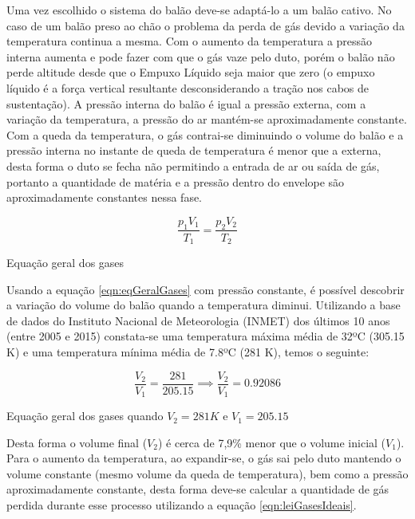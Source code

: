 		Uma vez escolhido o sistema do balão deve-se adaptá-lo a um balão cativo. No caso de um balão preso ao chão o problema da perda de gás devido a variação da temperatura continua a mesma. Com o aumento da temperatura a pressão interna aumenta e pode fazer com que o gás vaze pelo duto, porém o balão não perde altitude desde que o Empuxo Líquido seja maior que zero (o empuxo líquido é a força vertical resultante desconsiderando a tração nos cabos de sustentação). A pressão interna do balão é igual a pressão externa, com a variação da temperatura, a pressão do ar mantém-se aproximadamente constante.  Com a queda da temperatura, o gás contrai-se diminuindo o volume do balão e a pressão interna no instante de queda de temperatura é menor que a externa, desta forma o duto se fecha não permitindo a entrada de ar ou saída de gás, portanto a quantidade de matéria e a pressão dentro do envelope são aproximadamente constantes nessa fase.

		\begin{equacao}
		  \begin{equation}
		  	\frac{p_{1} V_{1}}{T_{1}} = \frac{p_{2} V_{2}}{T_{2}}
		  \end{equation}
		  \caption{Equação geral dos gases}
		  \label{eqn:eqGeralGases}
		\end{equacao}

		Usando a equação \eqref{eqn:eqGeralGases} com pressão constante, é possível descobrir a variação do volume do balão quando a temperatura diminui. Utilizando a base de dados do Instituto Nacional de Meteorologia (INMET) dos últimos 10 anos (entre 2005 e 2015) constata-se uma temperatura máxima média de 32ºC (305.15 K) e uma temperatura mínima média de 7.8ºC (281 K), temos o seguinte:

		\begin{equacao}
		  \begin{equation}
				\frac{V_{2}}{V_{1}} = \frac{281}{205.15} \implies \frac{V_{2}}{V_{1}} = 0.92086
		  \end{equation}
		  \caption{Equação geral dos gases quando $V_{2} = 281 K$ e $V_{1} = 205.15$}
		  \label{eqn:eqGeralGasesDef}
		\end{equacao}

		Desta forma o volume final ($V_{2}$) é cerca de 7,9\% menor que o volume inicial ($V_{1}$). Para o aumento da temperatura, ao expandir-se, o gás sai pelo duto mantendo o volume constante (mesmo volume da queda de temperatura), bem como a pressão aproximadamente constante, desta forma deve-se calcular a quantidade de gás perdida durante esse processo utilizando a equação \eqref{eqn:leiGasesIdeais}.

